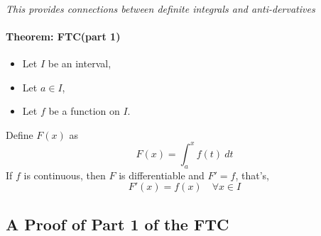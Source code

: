 \documentclass{article}
\begin{document}
	\paragraph{}\emph{This provides connections between definite integrals and anti-dervatives}
	\paragraph{Theorem: FTC(part 1)}
	\begin{itemize}
		\item Let $I$ be an interval,
		\item Let $a \in I$,
		\item Let $f$ be a function on $I$.
	\end{itemize}
	Define $F(x)$ as 
	\[
	F(x) = \int_a^x{f(t)\ dt}
	\]
	If $f$ is continuous, then $F$ is differentiable and $F' = f$, that's,
	\[
	F'(x) = f(x) \quad \forall x \in I
	\]
	
	\subsection{A Proof of Part 1 of the FTC}
\end{document}
